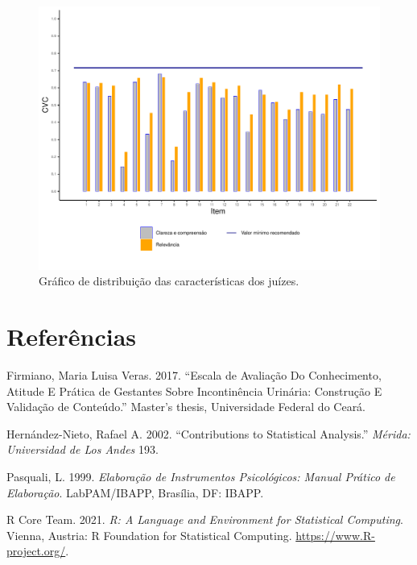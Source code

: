 \documentclass[
]{article}
\newlength{\cslhangindent}
\newenvironment{cslreferences}%
  {\setlength{\parindent}{0pt}%
  \everypar{\setlength{\hangindent}{\cslhangindent}}\ignorespaces}%
  {\par}
\begin{document}
\begin{figure}[htbp]

{\centering \includegraphics[width=0.9\linewidth]{../figures/grafico2_80_perc} 

}

\caption{Gráfico de distribuição das características dos juízes.}\label{fig:grafico2V2}
\end{figure}

\cleardoublepage

\hypertarget{referuxeancias}{%
\section*{Referências}\label{referuxeancias}}

\hypertarget{refs}{}
\begin{cslreferences}
\leavevmode\hypertarget{ref-firmiano2017escala}{}%
Firmiano, Maria Luisa Veras. 2017. ``Escala de Avaliação Do Conhecimento, Atitude E Prática de Gestantes Sobre Incontinência Urinária: Construção E Validação de Conteúdo.'' Master's thesis, Universidade Federal do Ceará.

\leavevmode\hypertarget{ref-hernandez2002contributions}{}%
Hernández-Nieto, Rafael A. 2002. ``Contributions to Statistical Analysis.'' \emph{Mérida: Universidad de Los Andes} 193.

\leavevmode\hypertarget{ref-pasquali1999elaboraccao}{}%
Pasquali, L. 1999. \emph{Elaboração de Instrumentos Psicológicos: Manual Prático de Elaboração}. LabPAM/IBAPP, Brasília, DF: IBAPP.

\leavevmode\hypertarget{ref-Rlang}{}%
R Core Team. 2021. \emph{R: A Language and Environment for Statistical Computing}. Vienna, Austria: R Foundation for Statistical Computing. \url{https://www.R-project.org/}.
\end{cslreferences}
\end{document}
